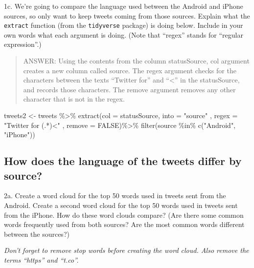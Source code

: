 \documentclass[
]{article}
\newenvironment{Shaded}{\begin{snugshade}}{\end{snugshade}}
\newcommand{\AttributeTok}[1]{\textcolor[rgb]{0.77,0.63,0.00}{#1}}
\newcommand{\ConstantTok}[1]{\textcolor[rgb]{0.00,0.00,0.00}{#1}}
\newcommand{\FunctionTok}[1]{\textcolor[rgb]{0.00,0.00,0.00}{#1}}
\newcommand{\NormalTok}[1]{#1}
\newcommand{\OtherTok}[1]{\textcolor[rgb]{0.56,0.35,0.01}{#1}}
\newcommand{\SpecialCharTok}[1]{\textcolor[rgb]{0.00,0.00,0.00}{#1}}
\newcommand{\StringTok}[1]{\textcolor[rgb]{0.31,0.60,0.02}{#1}}
\begin{document}
\newpage

1c. We're going to compare the language used between the Android and
iPhone sources, so only want to keep tweets coming from those sources.
Explain what the \texttt{extract} function (from the \texttt{tidyverse}
package) is doing below. Include in your own words what each argument is
doing. (Note that ``regex'' stands for ``regular expression''.)

\begin{quote}
ANSWER: Using the contents from the column statusSource, col argument
creates a new column called source. The regex argument checks for the
characters between the texts ``Twitter for'' and ``\textless{}'' in the
statusSource, and records those characters. The remove argument removes
any other character that is not in the regex.
\end{quote}

\begin{Shaded}
\begin{Highlighting}[]
\NormalTok{tweets2 }\OtherTok{\textless{}{-}}\NormalTok{ tweets }\SpecialCharTok{\%\textgreater{}\%}
  \FunctionTok{extract}\NormalTok{(}\AttributeTok{col =}\NormalTok{ statusSource, }\AttributeTok{into =} \StringTok{"source"}
\NormalTok{          , }\AttributeTok{regex =} \StringTok{"Twitter for (.*)\textless{}"}
\NormalTok{          , }\AttributeTok{remove =} \ConstantTok{FALSE}\NormalTok{)}\SpecialCharTok{\%\textgreater{}\%}
  \FunctionTok{filter}\NormalTok{(source }\SpecialCharTok{\%in\%} \FunctionTok{c}\NormalTok{(}\StringTok{"Android"}\NormalTok{, }\StringTok{"iPhone"}\NormalTok{))}
\end{Highlighting}
\end{Shaded}

\newpage

\hypertarget{how-does-the-language-of-the-tweets-differ-by-source}{%
\subsection{How does the language of the tweets differ by
source?}\label{how-does-the-language-of-the-tweets-differ-by-source}}

2a. Create a word cloud for the top 50 words used in tweets sent from
the Android. Create a second word cloud for the top 50 words used in
tweets sent from the iPhone. How do these word clouds compare? (Are
there some common words frequently used from both sources? Are the most
common words different between the sources?)

\emph{Don't forget to remove stop words before creating the word cloud.
Also remove the terms ``https'' and ``t.co''.}
\end{document}
